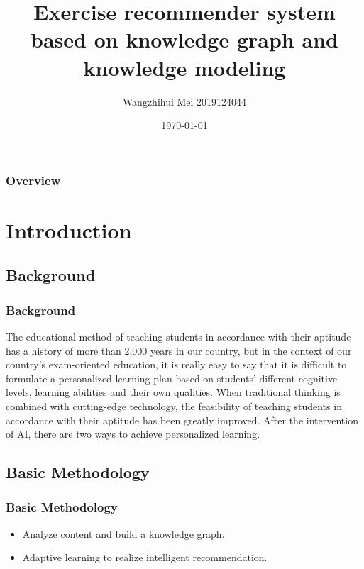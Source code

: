 \documentclass{beamer}
\title[Short title]{Exercise recommender system based on knowledge graph and knowledge modeling} %
\author{ Wangzhihui Mei 2019124044} %
\institute[JI] %
{
CCNU-UOW JI \\ %
\medskip
\textit{maywzh@gmail.com} %
}
\date{\today} %
\begin{document}
\begin{frame}
\titlepage %
\end{frame}

\begin{frame}
\frametitle{Overview} %
\tableofcontents %
\end{frame}


\section{Introduction}
\subsection{Background}
\begin{frame}
  \frametitle{Background}
  The educational method of teaching students in accordance with their aptitude has a history of more than 2,000 years in our country, but in the context of our country’s exam-oriented education, it is really easy to say that it is difficult to formulate a personalized learning plan based on students' different cognitive levels, learning abilities and their own qualities. When traditional thinking is combined with cutting-edge technology, the feasibility of teaching students in accordance with their aptitude has been greatly improved. After the intervention of AI, there are two ways to achieve personalized learning.

\end{frame}

\subsection{Basic Methodology}
\begin{frame}
  \frametitle{Basic Methodology}
  \begin{itemize}
    \item Analyze content and build a knowledge graph.
    \item Adaptive learning to realize intelligent recommendation.
  \end{itemize}
\end{frame}
\end{document}
